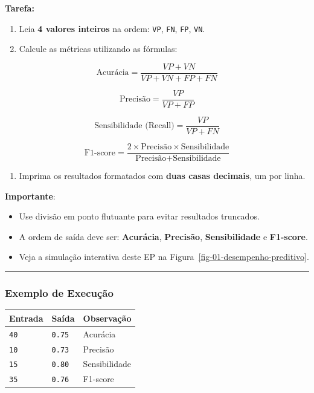 \documentclass[
  portuguese,
  letterpaper,
  openany,
  oneside,
  12pt,
  a4paper]{book}
\providecommand{\tightlist}{%
  \setlength{\itemsep}{0pt}\setlength{\parskip}{0pt}}
\begin{document}
\textbf{Tarefa:}

\begin{enumerate}
\def\labelenumi{\arabic{enumi}.}
\tightlist
\item
  Leia \textbf{4 valores inteiros} na ordem: \texttt{VP}, \texttt{FN},
  \texttt{FP}, \texttt{VN}.
\item
  Calcule as métricas utilizando as fórmulas:
\end{enumerate}

\[\text{Acurácia} = \frac{VP + VN}{VP + VN + FP + FN}\]

\[\text{Precisão} = \frac{VP}{VP + FP}\]

\[\text{Sensibilidade (Recall)} = \frac{VP}{VP + FN}\]

\[\text{F1-score} = \frac{2 \times \text{Precisão} \times \text{Sensibilidade}}{\text{Precisão} + \text{Sensibilidade}}\]

\begin{enumerate}
\def\labelenumi{\arabic{enumi}.}
\setcounter{enumi}{2}
\tightlist
\item
  Imprima os resultados formatados com \textbf{duas casas decimais}, um
  por linha.
\end{enumerate}

 \textbf{Importante}:

\begin{itemize}
\tightlist
\item
  Use divisão em ponto flutuante para evitar resultados truncados.
\item
  A ordem de saída deve ser: \textbf{Acurácia}, \textbf{Precisão},
  \textbf{Sensibilidade} e \textbf{F1-score}.
\item
  Veja a simulação interativa deste EP na
  Figura~\ref{fig-01-desempenho-preditivo}.
\end{itemize}

\begin{center}\rule{0.5\linewidth}{0.5pt}\end{center}

\subsubsection{\texorpdfstring{ Exemplo de
Execução}{ Exemplo de Execução}}\label{exemplo-de-execuuxe7uxe3o}

\begin{longtable}[]{@{}lll@{}}
\toprule\noalign{}
Entrada & Saída & Observação \\
\midrule\noalign{}
\endhead
\bottomrule\noalign{}
\endlastfoot
\texttt{40} & \texttt{0.75} & Acurácia \\
\texttt{10} & \texttt{0.73} & Precisão \\
\texttt{15} & \texttt{0.80} & Sensibilidade \\
\texttt{35} & \texttt{0.76} & F1-score \\
\end{longtable}
\end{document}
